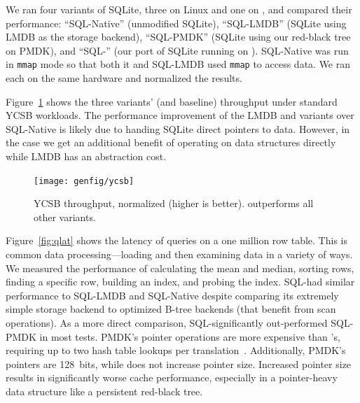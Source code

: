 We ran four variants of SQLite, three on Linux and one on \Twizzler, and compared their performance: ``SQL-Native'' (unmodified SQLite),
``SQL-LMDB'' (SQLite using LMDB as the storage backend), ``SQL-PMDK'' (SQLite using
our red-black tree on PMDK),
and ``SQL-\Twizzler'' (our port of SQLite running on \Twizzler). SQL-Native was run in \texttt{mmap} mode so that both it
and SQL-LMDB used \texttt{mmap} to access data.
We ran each on the same hardware and normalized the results.


Figure~\ref{fig:ycsb} shows the three variants' (and baseline) throughput under standard YCSB
workloads. The performance improvement of the LMDB and \Twizzler variants over SQL-Native is
likely due to handing SQLite direct pointers to data. However, in the \Twizzler
case we get an additional benefit of operating on data structures directly while LMDB has an
abstraction cost.

\begin{figure}
    \centering
    \texttt{[image: genfig/ycsb]}
    \caption[YCSB throughput]{YCSB throughput, normalized (higher is better). \Twizzler outperforms all other
        variants.}
    \label{fig:ycsb}
\end{figure}

Figure~\ref{fig:qlat} shows the latency of queries on a one million row table.
This is common data processing---loading and then
examining data in a variety of ways.
We measured the performance
of calculating the mean and median, sorting rows, finding a specific row,
building an index, and probing the index. SQL-\Twizzler had similar performance to SQL-LMDB and
SQL-Native despite comparing its extremely simple storage backend to optimized B-tree
backends (that benefit from scan operations). As a more direct comparison,
SQL-\Twizzler significantly out-performed SQL-PMDK in most tests. PMDK's pointer operations are
more expensive than \Twizzler's, requiring up to two hash table lookups per
translation~\cite{pmdk-pointers}. Additionally, PMDK's
pointers are 128~bits, while \Twizzler does not increase pointer size. Increased
pointer size results in significantly worse cache performance, especially in a pointer-heavy data
structure like a persistent red-black tree.



